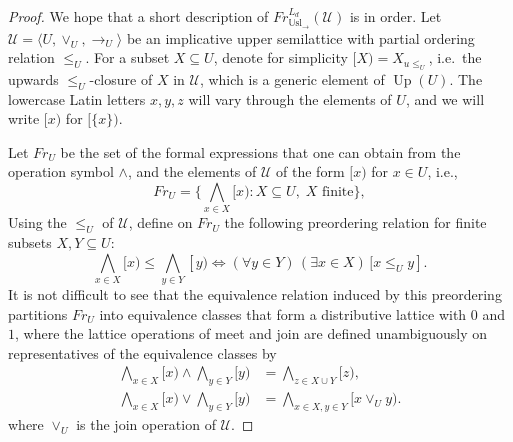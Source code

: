 \documentclass[11pt]{amsart}
\DeclareMathOperator{\up}{Up}
\newcommand{\Usl}{\mathbb{U}\textrm{sl}}
\newcommand{\QA}[1]{(\forall{#1})\,}
\newcommand{\QE}[1]{(\exists{#1})\,}
\begin{document}
\begin{proof}

We hope that a short description of $Fr^{L_d}_{\Usl_{\rightarrow}} 
(\mathscr{U})$ is in order. Let $\mathscr{U}=\langle U, \lor_U, \rightarrow_U \rangle$
be an implicative upper semilattice with partial ordering relation 
$\leq_U$. For a subset $X \subseteq U$, denote for simplicity 
$[X)=X_{u\leq_U}$, i.e.\ the upwards $\leq_U$-closure of $X$ in $\mathscr{U}$, 
which is a generic element of $\up(U)$. The lowercase Latin letters $x, y, z$ 
will vary through the elements of $U$, and we will write $[x)$ for $[\{x\})$. 

Let $Fr_U$ be the set of the formal expressions that one can obtain from the 
operation symbol $\wedge$, and the elements of $\mathscr{U}$ of the form 
$[x)$ for $x \in U$, i.e., 
\[
Fr_U=\{\bigwedge_{x \in X} [x): X \subseteq U,\; X \textrm{ finite}\},
\]
Using the $\leq_U$ of $\mathscr{U}$, define on $Fr_U$ the following
preordering relation for finite subsets $X,Y \subseteq U$:
\[
\bigwedge_{x \in X} [x) \leq \bigwedge_{y \in Y} [y) \Leftrightarrow
\QA{y \in Y}\QE{x \in X}\big[x \leq_U y].
\]
It is not difficult to see that the equivalence relation induced by this 
preordering partitions $Fr_U$ into equivalence classes that form a 
distributive lattice with $0$ and $1$, where the lattice operations of meet 
and join are defined unambiguously on representatives of the equivalence 
classes by   
\begin{align*}
\bigwedge_{x \in X} [x) \wedge \bigwedge_{y \in Y} [y)
&= \bigwedge_{z \in X \cup Y}[z),\\
\bigwedge_{x \in X} [x) \lor \bigwedge_{y \in Y} [y)
&= \bigwedge_{x \in X, y \in Y} [x \lor_U y).
\end{align*}
where $\lor_U$ is the join operation of $\mathscr{U}$.


\end{proof}
\end{document}
